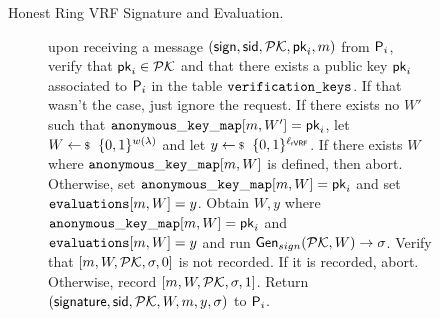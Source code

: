 \begin{figure}
\begin{tcolorbox}
{\begin{description}
				
				
				\item[Honest Ring VRF Signature and Evaluation.] upon receiving a message $(\mathsf{sign}, \textsf{sid}, {\mathcal{PK}}, \mathsf{pk}_i, m)$ from $\mathsf{P}_i$, verify that $\mathsf{pk}_i \in {\ensuremath{\mathcal{PK}}}$ and that there exists a public key $\mathsf{pk}_i$ associated to $\mathsf{P}_i$ in the table $ \texttt{verification\_keys} $. If that wasn't the case, just ignore the request. 	
				If there exists no $ W' $ such that $ \mathtt{anonymous\_key\_map}[m,W'] =  \mathsf{pk}_i $, let $ W \leftsample \{0,1\}^{w(\secparam)}$ and let $y \leftsample \bin^{\ell_\rVRF}$. If there exists $ W $ where $ \mathtt{anonymous\_key\_map}[m,W] $ is defined, then abort. Otherwise, set $ \mathtt{anonymous\_key\_map}[m,W] = \mathsf{pk}_i $ and set $ \texttt{evaluations}[m, W] = y$.
				Obtain $ W, y $ where $ \mathtt{anonymous\_key\_map}[m,W] =\mathsf{pk}_i $ and $ \texttt{evaluations}[m, W] = y$  and run  $ \mathsf{Gen}_{sign}({\mathcal{PK}}, W) \rightarrow \sigma $. Verify that $ [m, W,{\mathcal{PK}}, \sigma, 0] $ is not recorded. If it is recorded, abort. Otherwise, record $ [m, W, {\mathcal{PK}},\sigma, 1] $. Return $(\mathsf{signature}, \textsf{sid}, {\mathcal{PK}},W,m, y, \sigma)$ to $\mathsf{P}_i$.
			
			

\end{description}}
\end{tcolorbox}
\end{figure}
